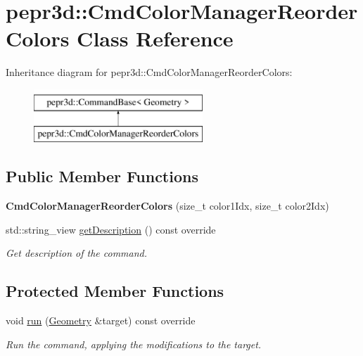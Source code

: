 \hypertarget{classpepr3d_1_1_cmd_color_manager_reorder_colors}{}\section{pepr3d\+::Cmd\+Color\+Manager\+Reorder\+Colors Class Reference}
\label{classpepr3d_1_1_cmd_color_manager_reorder_colors}
Inheritance diagram for pepr3d\+::Cmd\+Color\+Manager\+Reorder\+Colors\+:\begin{figure}[H]
\begin{center}
\leavevmode
\includegraphics[height=2.000000cm]{classpepr3d_1_1_cmd_color_manager_reorder_colors}
\end{center}
\end{figure}
\subsection*{Public Member Functions}
\begin{DoxyCompactItemize}
\item 
\mbox{\label{classpepr3d_1_1_cmd_color_manager_reorder_colors_a81dcf3c2b7affe3aef6fa8688be8edb7}} 
{\bfseries Cmd\+Color\+Manager\+Reorder\+Colors} (size\+\_\+t color1\+Idx, size\+\_\+t color2\+Idx)
\item 
\mbox{\label{classpepr3d_1_1_cmd_color_manager_reorder_colors_a165bc96ee062a1f4f35f3d34b6039fe1}} 
std\+::string\+\_\+view \mbox{\hyperlink{classpepr3d_1_1_cmd_color_manager_reorder_colors_a165bc96ee062a1f4f35f3d34b6039fe1}{get\+Description}} () const override
\begin{DoxyCompactList}\small\item\em Get description of the command. \end{DoxyCompactList}\end{DoxyCompactItemize}
\subsection*{Protected Member Functions}
\begin{DoxyCompactItemize}
\item 
\mbox{\label{classpepr3d_1_1_cmd_color_manager_reorder_colors_a10fd4859ee24045dab33287150fb2573}} 
void \mbox{\hyperlink{classpepr3d_1_1_cmd_color_manager_reorder_colors_a10fd4859ee24045dab33287150fb2573}{run}} (\mbox{\hyperlink{classpepr3d_1_1_geometry}{Geometry}} \&target) const override
\begin{DoxyCompactList}\small\item\em Run the command, applying the modifications to the target. \end{DoxyCompactList}\end{DoxyCompactItemize}

